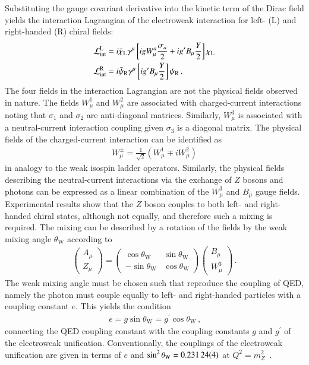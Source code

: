 Substituting the gauge covariant derivative into the kinetic term of the Dirac
field yields the interaction Lagrangian of the electroweak interaction for left-
(L) and right-handed (R) chiral fields:
\begin{align}
  &\mathcal{L}_{\text{int}}^{\text{L}} = i \bar{\chi}_{\text{L}} \gamma^\mu \left[i g W_\mu^a \frac{\sigma_a}{2} + i g^\prime B_\mu \frac{Y}{2} \right] \chi_{\text{L}} \label{eq:theory_electroweak_left} \\
  &\mathcal{L}_{\text{int}}^{\text{R}} = i \bar{\psi}_{\text{R}} \gamma^\mu \left[i g^\prime B_\mu \frac{Y}{2} \right] \psi_{\text{R}} \,\text{.} \label{eq:theory_electroweak_right}
\end{align}
The four fields in the interaction Lagrangian are not the physical fields
observed in nature. The fields $W_\mu^1$ and $W_\mu^2$ are associated with
charged-current interactions noting that $\sigma_1$ and $\sigma_2$ are
anti-diagonal matrices. Similarly, $W_\mu^3$ is associated with a
neutral-current interaction coupling given $\sigma_3$ is a diagonal matrix.  The
physical fields of the charged-current interaction can be identified as
\begin{align*}
  W_\mu^\pm = \frac{1}{\sqrt{2}} (W_\mu^1 \mp i W_\mu^2)
\end{align*}
in analogy to the weak isospin ladder operators. Similarly, the physical fields
describing the neutral-current interactions via the exchange of $Z$ bosons and
photons can be expressed as a linear combination of the $W_\mu^3$ and $B_\mu$
gauge fields. Experimental results show that the $Z$ boson couples to both left-
and right-handed chiral states, although not equally, and therefore such a
mixing is required. The mixing can be described by a rotation of the fields by
the weak mixing angle $\theta_{\text{W}}$ according to
\begin{align*}
  \begin{pmatrix}
    A_\mu \\
    Z_\mu
  \end{pmatrix}
  =
  \begin{pmatrix}
    \cos\theta_{\text{W}} & \sin\theta_{\text{W}} \\
    -\sin\theta_{\text{W}} & \cos\theta_{\text{W}}
  \end{pmatrix}
  \begin{pmatrix}
    B_\mu \\
    W_\mu^3
  \end{pmatrix} \,\text{.}
\end{align*}
The weak mixing angle must be chosen such that
 reproduce the
coupling of QED, namely the photon must couple equally to left- and right-handed
particles with a coupling constant $e$. This yields the condition
\begin{align*}
  e = g \sin\theta_{\text{W}} = g^\prime \cos\theta_{\text{W}} \,\text{,}
\end{align*}
connecting the QED coupling constant with the coupling constants $g$ and
$g^\prime$ of the electroweak unification. Conventionally, the couplings of the
electroweak unification are given in terms of $e$ and
$\sin^2\theta_{\text{W}} = \num{0.23124 +- 0.00004}$ at
$Q^2 = m_{Z}^2$~\cite{pdg2020}.

